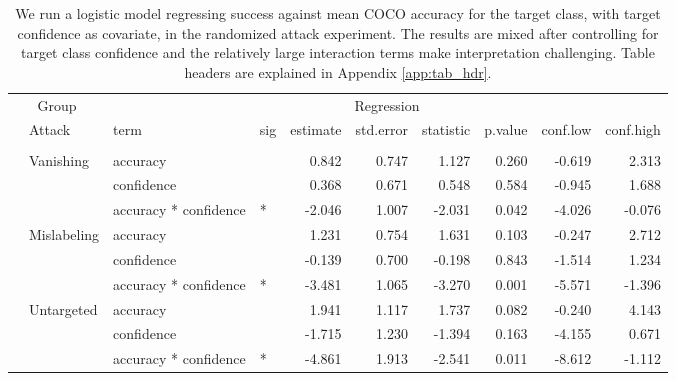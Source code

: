 \begin{longtable}[t]{llllrrrrrr}
\caption{\label{tab:target_success_table}We run a logistic model regressing success against mean COCO accuracy for the target class, with target confidence as covariate, in the randomized attack experiment. The results are mixed after controlling for target class confidence and the relatively large interaction terms make interpretation challenging. Table headers are explained in Appendix \ref{app:tab_hdr}.}\\
\toprule
\multicolumn{2}{c}{Group} & \multicolumn{8}{c}{Regression} \\
\cmidrule(l{3pt}r{3pt}){1-2} \cmidrule(l{3pt}r{3pt}){3-10}
 & Attack & term & sig & estimate & std.error & statistic & p.value & conf.low & conf.high\\
\midrule
\addlinespace[0.3em]
\multicolumn{10}{l}{\textbf{YOLOv3}}\\
\hspace{1em} & Vanishing & accuracy &  & 0.842 & 0.747 & 1.127 & 0.260 & -0.619 & 2.313\\
\cmidrule{3-10}\nopagebreak
\hspace{1em} &  & confidence &  & 0.368 & 0.671 & 0.548 & 0.584 & -0.945 & 1.688\\
\cmidrule{3-10}\nopagebreak
\hspace{1em} &  & accuracy * confidence & * & -2.046 & 1.007 & -2.031 & 0.042 & -4.026 & -0.076\\
\cmidrule{2-10}\nopagebreak
\hspace{1em} & Mislabeling & accuracy &  & 1.231 & 0.754 & 1.631 & 0.103 & -0.247 & 2.712\\
\cmidrule{3-10}\nopagebreak
\hspace{1em} &  & confidence &  & -0.139 & 0.700 & -0.198 & 0.843 & -1.514 & 1.234\\
\cmidrule{3-10}\nopagebreak
\hspace{1em} &  & accuracy * confidence & * & -3.481 & 1.065 & -3.270 & 0.001 & -5.571 & -1.396\\
\cmidrule{2-10}\nopagebreak
\hspace{1em} & Untargeted & accuracy &  & 1.941 & 1.117 & 1.737 & 0.082 & -0.240 & 4.143\\
\cmidrule{3-10}\nopagebreak
\hspace{1em} &  & confidence &  & -1.715 & 1.230 & -1.394 & 0.163 & -4.155 & 0.671\\
\cmidrule{3-10}\nopagebreak
\hspace{1em} &  & accuracy * confidence & * & -4.861 & 1.913 & -2.541 & 0.011 & -8.612 & -1.112\\

\end{longtable}
